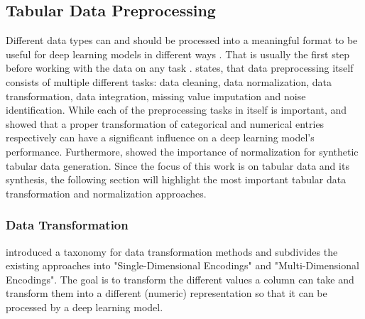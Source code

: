 \subsection{Tabular Data Preprocessing}
\label{sec:preprocessing}

Different data types can and should be processed into a meaningful format to be useful for deep learning models in different ways \cite{fan2020RelationalDataSynthesisa, lederrey2022DATGANIntegratingExperta}.
That is usually the first step before working with the data on any task \cite{izonin2022TwoStepDataNormalization}.
\textcite{garcia2016BigDataPreprocessing} states, that data preprocessing itself consists of multiple different tasks: data cleaning, data normalization, data transformation, data integration, missing value imputation and noise identification.
While each of the preprocessing tasks in itself is important, 
\textcite{fitkov-norris2012EvaluatingImpactCategorical} and \textcite{gorishniy2022EmbeddingsNumericalFeatures} showed that a proper transformation of categorical and numerical entries respectively can have a significant influence on a deep learning \gls{model}'s performance.
Furthermore, \textcite{xu2019ModelingTabularData} showed the importance of normalization for synthetic tabular data generation.
Since the focus of this work is on tabular data and its synthesis, the following section will highlight the most important tabular data transformation and normalization approaches.

\subsubsection{Data Transformation}
\label{sec:dataTransformation}

\textcite[p. 5]{borisov2022DeepNeuralNetworks} introduced a taxonomy for data transformation methods and subdivides the existing approaches into "Single-Dimensional Encodings" and "Multi-Dimensional Encodings".
The goal is to transform the different values a column can take and transform them into a different (numeric) representation so that it can be processed by a deep learning \gls{model}.

